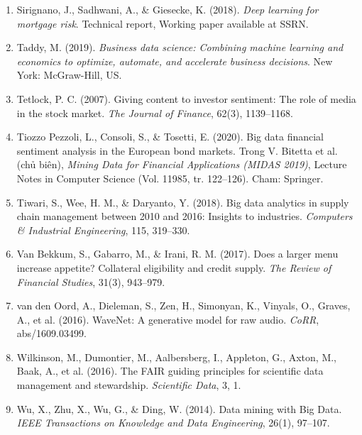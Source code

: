 \begin{enumerate}
\item Sirignano, J., Sadhwani, A., \& Giesecke, K. (2018). \emph{Deep learning for mortgage risk}. Technical report, Working paper available at SSRN.
\item Taddy, M. (2019). \emph{Business data science: Combining machine learning and economics to optimize, automate, and accelerate business decisions}. New York: McGraw-Hill, US.
\item Tetlock, P. C. (2007). Giving content to investor sentiment: The role of media in the stock market. \emph{The Journal of Finance}, 62(3), 1139--1168.
\item Tiozzo Pezzoli, L., Consoli, S., \& Tosetti, E. (2020). Big data financial sentiment analysis in the European bond markets. Trong V. Bitetta et al. (chủ biên), \emph{Mining Data for Financial Applications (MIDAS 2019)}, Lecture Notes in Computer Science (Vol. 11985, tr. 122--126). Cham: Springer.
\item Tiwari, S., Wee, H. M., \& Daryanto, Y. (2018). Big data analytics in supply chain management between 2010 and 2016: Insights to industries. \emph{Computers \& Industrial Engineering}, 115, 319--330.
\item Van Bekkum, S., Gabarro, M., \& Irani, R. M. (2017). Does a larger menu increase appetite? Collateral eligibility and credit supply. \emph{The Review of Financial Studies}, 31(3), 943--979.
\item van den Oord, A., Dieleman, S., Zen, H., Simonyan, K., Vinyals, O., Graves, A., et al. (2016). WaveNet: A generative model for raw audio. \emph{CoRR}, abs/1609.03499.
\item Wilkinson, M., Dumontier, M., Aalbersberg, I., Appleton, G., Axton, M., Baak, A., et al. (2016). The FAIR guiding principles for scientific data management and stewardship. \emph{Scientific Data}, 3, 1.
\item Wu, X., Zhu, X., Wu, G., \& Ding, W. (2014). Data mining with Big Data. \emph{IEEE Transactions on Knowledge and Data Engineering}, 26(1), 97--107.
\end{enumerate}
